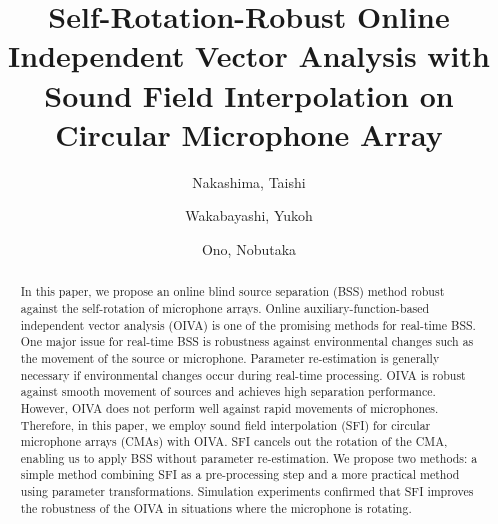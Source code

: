 \documentclass[sip,biber]{now-journal}
\title{Self-Rotation-Robust Online Independent Vector Analysis with\\Sound Field Interpolation on Circular Microphone Array}
\author{Nakashima, Taishi}
\affil{Tokyo Metropolitan University, Tokyo, Japan}
\author{Wakabayashi, Yukoh}
\affil{Toyohashi University of Technology, Aichi, Japan}
\author[1]{Ono, Nobutaka}
\begin{document}
\begin{abstract}
  In this paper, we propose an online blind source separation (BSS) method robust against the self-rotation of microphone arrays.
  Online auxiliary-function-based independent vector analysis (OIVA) is one of the promising methods for real-time BSS.
  One major issue for real-time BSS is robustness against environmental changes such as the movement of the source or microphone.
  Parameter re-estimation is generally necessary if environmental changes occur during real-time processing.
  OIVA is robust against smooth movement of sources and achieves high separation performance.
  However, OIVA does not perform well against rapid movements of microphones.
  Therefore, in this paper, we employ sound field interpolation (SFI) for circular microphone arrays (CMAs) with OIVA.
  SFI cancels out the rotation of the CMA, enabling us to apply BSS without parameter re-estimation.
  We propose two methods: a simple method combining SFI as a pre-processing step and a more practical method using parameter transformations. 
  Simulation experiments confirmed that SFI improves the robustness of the OIVA in situations where the microphone is rotating.
\end{abstract}
\end{document}
